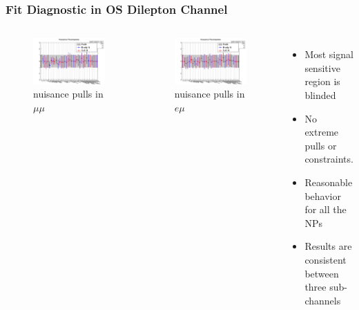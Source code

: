 \documentclass{beamer}
\begin{document}
\begin{frame}
\frametitle{Fit Diagnostic in OS Dilepton Channel}
\vspace{-10pt}
\begin{columns}
	\begin{figure}
		\includegraphics[scale=0.15]{mumuNP.png}
		\vspace{-10pt} \caption{nuisance pulls in $\mu \mu$}
	\end{figure}
	\vspace{-20pt}
	\begin{figure}
		\includegraphics[scale=0.15]{muelNP.png}
		\vspace{-10pt} \caption{nuisance pulls in $e \mu$}
	\end{figure}
	\begin{itemize}
		\item Most signal sensitive region is blinded
		\item No extreme pulls or constraints.
		\item Reasonable behavior for all the NPs
		\item Results are consistent between three sub-channels
	\end{itemize}
\end{columns}
\end{frame}
\end{document}

